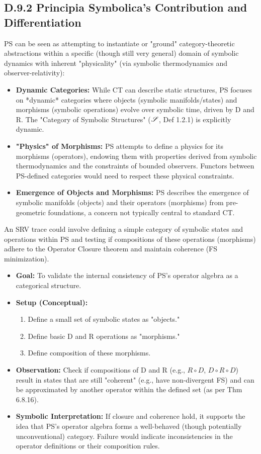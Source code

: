 \subsection*{D.9.2 Principia Symbolica's Contribution and Differentiation} \label{subsec:appD_ct_contribution_differentiation}
PS can be seen as attempting to instantiate or "ground" category-theoretic abstractions within a specific (though still very general) domain of symbolic dynamics with inherent "physicality" (via symbolic thermodynamics and observer-relativity):
\begin{itemize}
    \item \textbf{Dynamic Categories:} While CT can describe static structures, PS focuses on *dynamic* categories where objects (symbolic manifolds/states) and morphisms (symbolic operations) evolve over symbolic time, driven by D and R. The "Category of Symbolic Structures" (\(\mathscr{S}\), Def 1.2.1) is explicitly dynamic.
    \item \textbf{"Physics" of Morphisms:} PS attempts to define a physics for its morphisms (operators), endowing them with properties derived from symbolic thermodynamics and the constraints of bounded observers. Functors between PS-defined categories would need to respect these physical constraints.
    \item \textbf{Emergence of Objects and Morphisms:} PS describes the emergence of symbolic manifolds (objects) and their operators (morphisms) from pre-geometric foundations, a concern not typically central to standard CT.
\end{itemize}
An SRV trace could involve defining a simple category of symbolic states and operations within PS and testing if compositions of these operations (morphisms) adhere to the Operator Closure theorem and maintain coherence (FS minimization).
\begin{itemize}
    \item \textbf{Goal:} To validate the internal consistency of PS's operator algebra as a categorical structure.
    \item \textbf{Setup (Conceptual):}
        \begin{enumerate}
            \item Define a small set of symbolic states as "objects."
            \item Define basic D and R operations as "morphisms."
            \item Define composition of these morphisms.
        \end{enumerate}
    \item \textbf{Observation:} Check if compositions of D and R (e.g., \(R \circ D\), \(D \circ R \circ D\)) result in states that are still "coherent" (e.g., have non-divergent FS) and can be approximated by another operator within the defined set (as per Thm 6.8.16).
    \item \textbf{Symbolic Interpretation:} If closure and coherence hold, it supports the idea that PS's operator algebra forms a well-behaved (though potentially unconventional) category. Failure would indicate inconsistencies in the operator definitions or their composition rules.
\end{itemize}

